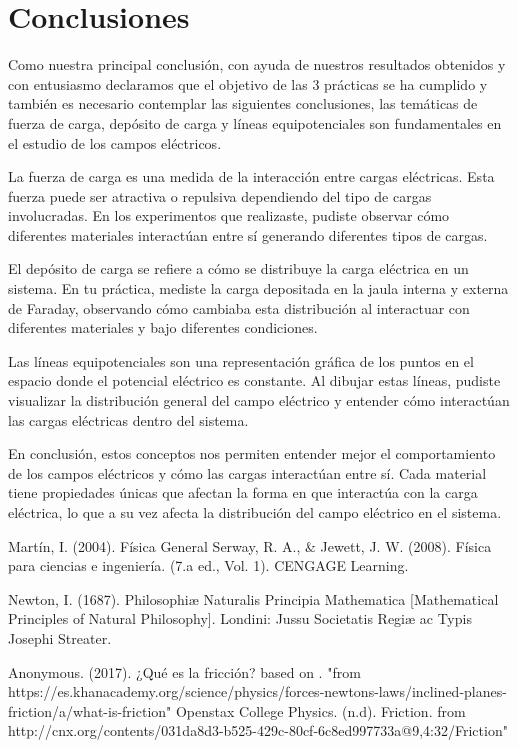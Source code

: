 \documentclass{article}
\begin{document}
\section{Conclusiones}\label{Conclusiones}				%
Como nuestra principal conclusión, con ayuda de nuestros resultados obtenidos y con entusiasmo declaramos que el objetivo de las 3 prácticas se ha cumplido
y también es necesario contemplar las siguientes conclusiones, las temáticas de fuerza de carga, depósito de carga y líneas equipotenciales son fundamentales en el estudio de los campos eléctricos. 

La fuerza de carga es una medida de la interacción entre cargas eléctricas. Esta fuerza puede ser atractiva o repulsiva dependiendo del tipo de cargas involucradas. En los experimentos que realizaste, pudiste observar cómo diferentes materiales interactúan entre sí generando diferentes tipos de cargas.

El depósito de carga se refiere a cómo se distribuye la carga eléctrica en un sistema. En tu práctica, mediste la carga depositada en la jaula interna y externa de Faraday, observando cómo cambiaba esta distribución al interactuar con diferentes materiales y bajo diferentes condiciones.

Las líneas equipotenciales son una representación gráfica de los puntos en el espacio donde el potencial eléctrico es constante. Al dibujar estas líneas, pudiste visualizar la distribución general del campo eléctrico y entender cómo interactúan las cargas eléctricas dentro del sistema.

En conclusión, estos conceptos nos permiten entender mejor el comportamiento de los campos eléctricos y cómo las cargas interactúan entre sí. Cada material tiene propiedades únicas que afectan la forma en que interactúa con la carga eléctrica, lo que a su vez afecta la distribución del campo eléctrico en el sistema.

\begin{thebibliography}{9}						%
		Martín, I. (2004). Física General
		Serway, R. A., $\&$ Jewett, J. W. (2008). Física para ciencias e ingeniería. (7.a
ed., Vol. 1). CENGAGE Learning.

	Newton, I. (1687). Philosophiæ Naturalis Principia Mathematica [Mathematical Principles of Natural Philosophy]. Londini: Jussu Societatis Regiæ ac Typis Josephi Streater.

	Anonymous. (2017). ¿Qué es la fricción? based on \cite{Openstax College Physics}. "from https://es.khanacademy.org/science/physics/forces-newtons-laws/inclined-planes-friction/a/what-is-friction"
		Openstax College Physics. (n.d). Friction. from http://cnx.org/contents/031da8d3-b525-429c-80cf-6c8ed997733a@9,4:32/Friction"

\end{thebibliography}
\end{document}
